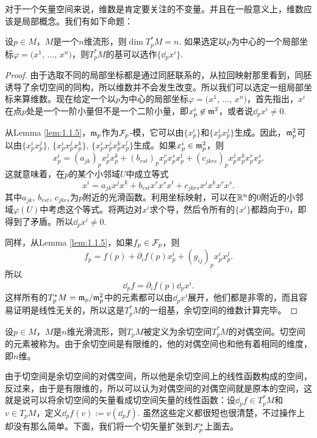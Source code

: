 对于一个矢量空间来说，维数是肯定要关注的不变量。并且在一般意义上，维数应该是局部概念。我们有如下命题：

\begin{pro}
设$p\in M$，$M$是一个$n$维流形，则$\dim T_p^*M=n$. 如果选定以$p$为中心的一个局部坐标$\varphi=(x^1$, $\dots$, $x^n)$，则$T_p^*M$的基可以选作$\{\dd_p x^i\}$.
\end{pro}

\begin{proof}
由于选取不同的局部坐标都是通过同胚联系的，从拉回映射那里看到，同胚诱导了余切空间的同构，所以维数并不会发生改变。所以我们可以选定一组局部坐标来算维数。现在给定一个以$p$为中心的局部坐标$\varphi=(x^1$, $\dots$, $x^n)$，首先指出，$x^i$在点$p$处是一个一阶小量但不是一个二阶小量，即$x^i_p\not\in \mathfrak{m}^2$，或者说$\dd_p x^i\neq 0$.

从Lemma \ref{lem:1.1.5}，$\mathfrak{m}_p$作为$\mathcal{F}_p$-模，它可以由$\{x^i_p\}$和$\{x^i_px^j_p\}$生成。因此，$\mathfrak{m}_p^2$可以由$\{x^i_px^j_{p}\}$, $\{x^i_px^j_{p}x^k_p\}$, $\{x^i_px^j_{p}x^k_px^l_p\}$生成。如果$x^i_p\in \mathfrak{m}_p^2$，则
\[
	x^i_p=(a_{jk})_px^j_px^k_p+(b_{rst})_p x^r_px^s_px^t_p+(c_{jkrs})_p x^j_px^k_px^r_px^s_p.
\]
这就意味着，在$p$的某个小邻域$U$中成立等式
\[
	x^i=a_{jk}x^j x^k +b_{rst} x^r x^s x^t +c_{jkrs} x^j x^k x^r x^s .
\]
其中$a_{jk}$, $b_{rst}$, $c_{jkrs}$为$p$附近的光滑函数。利用坐标映射，可以在$\mathbb{R}^n$的$0$附近的小邻域$\varphi(U)$中考虑这个等式。将两边对$x^i$求个导，然后令所有的$\{x^i\}$都趋向于$0$，即得到了矛盾。所以$\dd_p x^i\neq 0$.

同样，从Lemma \ref{lem:1.1.5}，如果$f_p\in \mathcal{F}_p$，则
\[
	f_p=f(p)+\partial_i f(p)x^i_p+(g_{ij})_p x^i_px^j_p.
\]
所以
\begin{equation}
\label{c1:e1}
	\dd_p f=\partial_i f(p)\dd_p x^i.
\end{equation}
这样所有的$T_p^*M=\mathfrak{m}_p/\mathfrak{m}_p^2$中的元素都可以由$\dd_px^i$展开，他们都是非零的，而且容易证明是线性无关的，所以这是$T_p^*M$的一组基，余切空间的维数计算完毕。
\end{proof}

\begin{para}
设$p\in M$，$M$是$n$维光滑流形，则$T_pM$被定义为余切空间$T_p^*M$的对偶空间。切空间的元素被称为。由于余切空间是有限维的，他的对偶空间也和他有着相同的维度，即$n$维。
\end{para}

由于切空间是余切空间的对偶空间，所以他是余切空间上的线性函数构成的空间，反过来，由于是有限维的，所以可以认为对偶空间的对偶空间就是原本的空间，这就是说可以将余切空间的矢量看成切空间矢量的线性函数：设$\dd_p f\in T_p^*M$和$v\in T_pM$，定义$\dd_p f(v):=v(\dd_p f)$. 虽然这些定义都很短也很清楚，不过操作上却没有那么简单。下面，我们将一个切矢量扩张到$\mathcal{F}_p^*$上面去。

